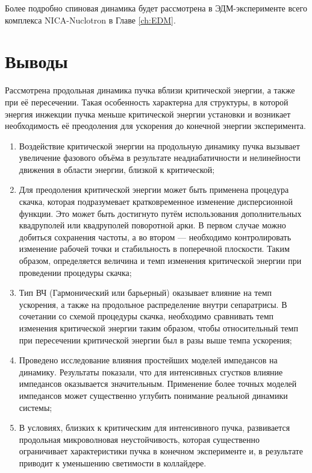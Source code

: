 \par Более подробно спиновая динамика будет рассмотрена в ЭДМ-эксперименте всего комплекса NICA-Nuclotron в Главе \ref{ch:EDM}.

\section*{Выводы}
\par Рассмотрена продольная динамика пучка вблизи критической энергии, а также при её пересечении. Такая особенность характерна для структуры, в которой энергия инжекции пучка меньше критической энергии установки и возникает необходимость её преодоления для ускорения до конечной энергии эксперимента.

\begin{enumerate}

\item Воздействие критической энергии на продольную динамику пучка вызывает увеличение фазового объёма в результате неадиабатичности и нелинейности движения в области энергии, близкой к критической;

\item Для преодоления критической энергии может быть применена процедура скачка, которая подразумевает кратковременное изменение дисперсионной функции. Это может быть достигнуто путём использования дополнительных квадруполей или квадруполей поворотной арки. В первом случае можно добиться сохранения частоты, а во втором — необходимо контролировать изменение рабочей точки и стабильность в поперечной плоскости. Таким образом, определяется величина и темп изменения критической энергии при проведении процедуры скачка;

\item Тип ВЧ (Гармонический или барьерный) оказывает влияние на темп ускорения, а также на продольное распределение внутри сепаратрисы. В сочетании со схемой процедуры скачка, необходимо сравнивать темп изменения критической энергии таким образом, чтобы относительный темп при пересечении критической энергии был в разы выше темпа ускорения;

\item Проведено исследование влияния простейших моделей импедансов на динамику. Результаты показали, что для интенсивных сгустков влияние импедансов оказывается значительным. Применение более точных моделей импедансов может существенно углубить понимание реальной динамики системы;

\item В условиях, близких к критическим для интенсивного пучка, развивается продольная микроволновая неустойчивость, которая существенно ограничивает характеристики пучка в конечном эксперименте и, в результате приводит к уменьшению светимости в коллайдере.

\end{enumerate}


\FloatBarrier
